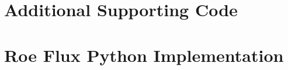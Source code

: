 \pagebreak
\addappheadtotoc
\begin{appendices}
    \appendixpage
    \section{Additional Supporting Code}

    

    \pagebreak
    

    \pagebreak
    

    \pagebreak
    \section{Roe Flux Python Implementation}

    


\end{appendices}